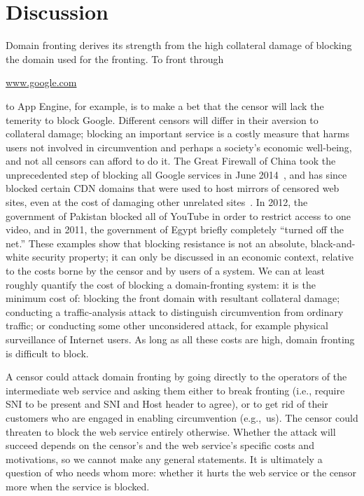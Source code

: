 \documentclass{sig-alternate}
\def\urll#1{\begin{NoHyper}\url{#1}\end{NoHyper}}
\begin{document}
\section{Discussion}
\label{sec:discussion}

Domain fronting derives its strength from the
high collateral damage of blocking the domain used for the fronting.
To front through \urll{www.google.com} to App Engine, for example,
is to make a bet that the censor will lack the temerity to block Google.
Different censors will differ in their aversion to collateral damage;
blocking an important service is a costly measure
that harms users not involved in circumvention and perhaps a society's economic well-being,
and not all censors can afford to do it.
The Great Firewall of China took the unprecedented step
of blocking all Google services in June 2014~\cite{cn-google-block,cn-google-block-greatfire},
and has since blocked certain CDN domains that were used to host
mirrors of censored web sites, even at the cost of damaging other unrelated sites~\cite{cn-edgecast-block-greatfire}.
In 2012, the government of Pakistan blocked all of YouTube
in order to restrict access to one video,
and in 2011, the government of Egypt briefly completely ``turned off the net.''
These examples show that blocking resistance is not an absolute,
black-and-white security property;
it can only be discussed in an economic context, relative to the costs borne
by the censor and by users of a system.
We can at least roughly quantify the cost of blocking a domain-fronting system:
it is the minimum cost of:
blocking the front domain with resultant collateral damage;
conducting a traffic-analysis attack to distinguish
circumvention from ordinary traffic; or
conducting some other unconsidered attack, for example physical surveillance of Internet users.
As long as all these costs are high,
domain fronting is difficult to block.

A censor could attack domain fronting by
going directly to the operators of the intermediate web service
and asking them either to break fronting
(i.e., require SNI to be present and SNI and Host header to agree),
or to get rid of their customers who are
engaged in enabling circumvention (e.g.,~us).
The censor could threaten to block the web service entirely otherwise.
Whether the attack will succeed depends on the censor's
and the web service's specific costs and motivations,
so we cannot make any general statements.
It is ultimately a question of who needs whom more:
whether it hurts the web service or the censor more
when the service is blocked.
\end{document}
